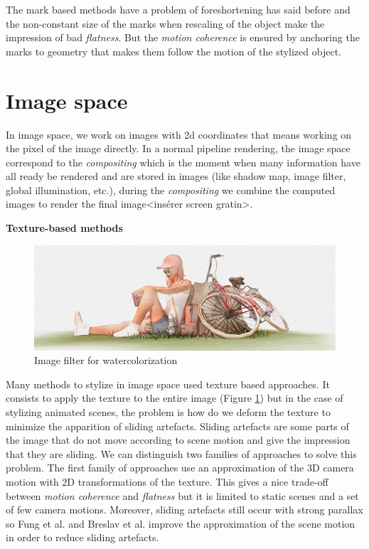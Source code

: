 The mark based methods have a problem of foreshortening has said before and the non-constant size of the marks when rescaling of the object make the impression of bad \textit{flatness}. But the \textit{motion coherence} is ensured by anchoring the marks to geometry that makes them follow the motion of the stylized object.




\section{Image space}

In image space, we work on images with 2d coordinates that means working on the pixel of the image directly. In a normal pipeline rendering, the image space correspond to the \textit{compositing} which is the moment when many information have all ready be rendered and are stored in images (like shadow map, image filter, global illumination, etc.), during the \textit{compositing} we combine the computed images to render the final image<insérer screen gratin>. \newline

\textbf{Texture-based methods}

\begin{figure}
    \begin{center}

    \includegraphics[scale=0.5]{pics/watercolor_MNPR.png}
    \end{center}
    \caption{Image filter for watercolorization \cite{montesdeoca_mnpr:_2018}}
    \label{watercolor_MNPR}
\end{figure}

Many methods to stylize in image space used texture based approaches. It consists to apply the texture to the entire image (Figure \ref{watercolor_MNPR}) \cite{benard_state---art_2011, montesdeoca_mnpr:_2018} but in the case of stylizing animated scenes, the problem is how do we deform the texture to minimize the apparition of sliding artefacts. Sliding artefacts are some parts of the image that do not move according to scene motion and give the impression that they are sliding. We can distinguish two families of approaches to solve this problem. The first family of approaches use an approximation of the 3D camera motion with 2D transformations of the texture\cite{cunzi_dynamic_nodate}. This gives a nice trade-off between \textit{motion coherence} and \textit{flatness} but it is limited to static scenes and a set of few camera motions. Moreover, sliding artefacts still occur with strong parallax so Fung et al.\cite{fung_pen-and-ink_nodate} and Breslav et al.\cite{breslav_dynamic_nodate} improve the approximation of the scene motion in order to reduce sliding artefacts.

